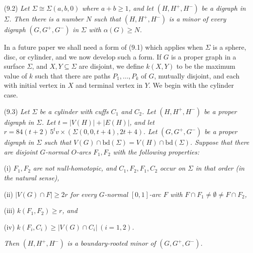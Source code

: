 \stmt
(9.2) \textit{Let $\Sigma \cong \Sigma(a, b, 0)$ where $a + b \ge 1$, and let $(H, H^+, H^-)$ be a digraph in $\Sigma$. Then there is a number $N$ such that $(H, H^+, H^-)$ is a minor of every digraph $(G, G^+, G^-)$ in $\Sigma$ with $\alpha(G) \ge N$.}

In a future paper we shall need a form of (9.1) which applies when $\Sigma$ is a sphere, disc, or cylinder, and we now develop such a form. If $G$ is a proper graph in a surface $\Sigma$, and $X, Y \subseteq \Sigma$ are disjoint, we define $k(X, Y)$ to be the maximum value of $k$ such that there are paths $P_1, \dots, P_k$ of $G$, mutually disjoint, and each with initial vertex in $X$ and terminal vertex in $Y$. We begin with the cylinder case.

\stmt
(9.3) \textit{Let $\Sigma$ be a cylinder with cuffs $C_1$ and $C_2$. Let $(H, H^+, H^-)$ be a proper digraph in $\Sigma$. Let $t = |V(H)| + |E(H)|$, and let $r = 84(t+2)\, 5^t v \times (\Sigma(0, 0, t+4), 2t+4)$. Let $(G, G^+, G^-)$ be a proper digraph in $\Sigma$ such that $V(G) \cap \mathrm{bd}(\Sigma) = V(H) \cap \mathrm{bd}(\Sigma)$. Suppose that there are disjoint $G$-normal $O$-arcs $F_1, F_2$ with the following properties:}

\hspace*{12pt}(i) \textit{$F_1, F_2$ are not null-homotopic, and $C_1, F_2, F_1, C_2$ occur on $\Sigma$ in that order (in the natural sense),}

\hspace*{12pt}(ii) \textit{$|V(G) \cap F| \ge 2r$ for every $G$-normal $[0, 1]$-arc $F$ with $F \cap F_1 \ne \emptyset \ne F \cap F_2$,}

\hspace*{12pt}(iii) \textit{$k(F_1, F_2) \ge r$, and}

\hspace*{12pt}(iv) \textit{$k(F_i, C_i) \ge |V(G) \cap C_i| \ (i = 1, 2)$.}

\textit{Then $(H, H^+, H^-)$ is a boundary-rooted minor of $(G, G^+, G^-)$.}


